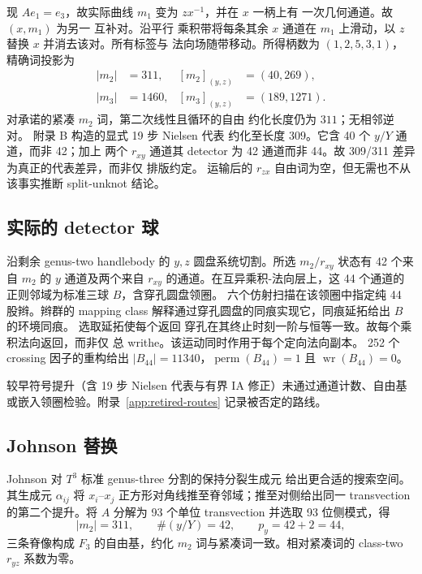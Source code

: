 现 $Ae_1=e_3$，故实际曲线 $m_1$ 变为 $zx^{-1}$，并在 $x$ 一柄上有
一次几何通道。故 $(x,m_1)$ 为另一
互补对。沿平行
乘积带将每条其余 $x$ 通道在 $m_1$ 上滑动，以 $z$ 替换 $x$ 并消去该对。所有标签与
法向场随带移动。所得柄数为 $(1,2,5,3,1)$，
精确词投影为
\[
\begin{aligned}
|m_2|&=311, & [m_2]_{(y,z)}&=(40,269),\\
|m_3|&=1460, & [m_3]_{(y,z)}&=(189,1271).
\end{aligned}
\]
对承诺的紧凑 $m_2$ 词，第二次线性且循环的自由
约化长度仍为 $311$；无相邻逆对。
附录 B 构造的显式 19 步 Nielsen 代表
约化至长度 $309$。它含 40 个 $y/Y$ 通道，而非 42；加上
两个 $r_{xy}$ 通道其 detector 为 42 通道而非 44。故
309/311 差异为真正的代表差异，而非仅
排版约定。
运输后的 $r_{zx}$ 自由词为空，但无需也不从该事实推断 split-unknot 结论。

\subsection{实际的 detector 球}

沿剩余 genus-two handlebody 的 $y,z$ 圆盘系统切割。所选
$m_2/r_{xy}$ 状态有 42 个来自 $m_2$ 的 $y$ 通道及两个来自
$r_{xy}$ 的通道。在互异乘积-法向层上，这 44 个通道的正则邻域为标准三球 $B$，含穿孔圆盘领圈。
六个仿射扫描在该领圈中指定纯 44 股辫。辫群的 mapping class 解释通过穿孔圆盘的同痕实现它，同痕延拓给出 $B$ 的环境同痕。
选取延拓使每个返回
穿孔在其终止时刻一阶与恒等一致。故每个乘积法向返回，而非仅
总 writhe。该运动同时作用于每个定向法向副本。
252 个 crossing 因子的重构给出
$|B_{44}|=11340$，$\operatorname{perm}(B_{44})=1$ 且
$\operatorname{wr}(B_{44})=0$。

\begin{remark}[被拒的紧凑提升]
较早符号提升（含 19 步 Nielsen 代表与有界 IA 修正）未通过通道计数、自由基或嵌入领圈检验。附录~\ref{app:retired-routes} 记录被否定的路线。
\end{remark}

\subsection{Johnson 替换}

Johnson 对 $T^3$ 标准 genus-three 分割的保持分裂生成元
\cite{Johnson2011} 给出更合适的搜索空间。其生成元
$\alpha_{ij}$ 将 $x_i$--$x_j$ 正方形对角线推至脊邻域；推至对侧给出同一 transvection 的第二个提升。将 $A$ 分解为 93 个单位 transvection 并选取 93 位侧模式，得
\[
|m_2|=311,\qquad \#(y/Y)=42,\qquad p_y=42+2=44,
\]
三条脊像构成 $F_3$ 的自由基，约化 $m_2$ 词与紧凑词一致。相对紧凑词的 class-two $r_{yz}$ 系数为零。

